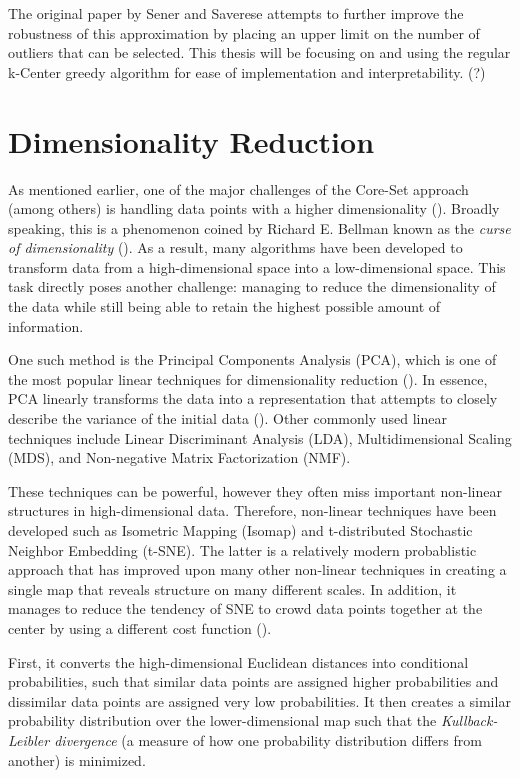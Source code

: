 \documentclass[english,bachelor,ul]{webisthesis} %
\begin{document}
The original paper by Sener and Saverese attempts to further improve the robustness of this approximation by placing an upper limit on the number of outliers that can be selected. This thesis will be focusing on and using the regular k-Center greedy algorithm for ease of implementation and interpretability. (?)

\section{Dimensionality Reduction}

As mentioned earlier, one of the major challenges of the Core-Set approach (among others) is handling data points with a higher dimensionality (\cite{DBLP:conf/iccv/SinhaED19}). Broadly speaking, this is a phenomenon coined by Richard E. Bellman known as the \textit{curse of dimensionality} (\cite{franccois2007high}). As a result, many algorithms have been developed to transform data from a high-dimensional space into a low-dimensional space. This task directly poses another challenge: managing to reduce the dimensionality of the data while still being able to retain the highest possible amount of information. 

One such method is the Principal Components Analysis (PCA), which is one of the most popular linear techniques for dimensionality reduction (\cite{van2009dimensionality}). In essence, PCA linearly transforms the data into a representation that attempts to closely describe the variance of the initial data (\cite{jolliffe2016principal}). Other commonly used linear techniques include Linear Discriminant Analysis (LDA), Multidimensional Scaling (MDS), and Non-negative Matrix Factorization (NMF).

These techniques can be powerful, however they often miss important non-linear structures in high-dimensional data. Therefore, non-linear techniques have been developed such as Isometric Mapping (Isomap) and t-distributed Stochastic Neighbor Embedding (t-SNE). The latter is a relatively modern probablistic approach that has improved upon many other non-linear techniques in creating a single map that reveals structure on many different scales. In addition, it manages to reduce the tendency of SNE to crowd data points together at the center by using a different cost function (\cite{van2008visualizing}). 

First, it converts the high-dimensional Euclidean distances into conditional probabilities, such that similar data points are assigned higher probabilities and dissimilar data points are assigned very low probabilities. It then creates a similar probability distribution over the lower-dimensional map such that the \textit{Kullback-Leibler divergence} (a measure of how one probability distribution differs from another) is minimized.
\end{document}
